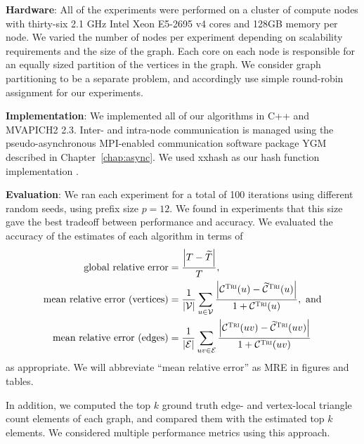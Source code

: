 \documentclass[10]{report}
\newcommand{\algoname}[1]{\textnormal{\textsc{#1}}}
\begin{document}
\noindent
\textbf{Hardware}: 
All of the experiments were performed on a cluster of compute nodes with thirty-six 2.1 GHz Intel Xeon E5-2695 v4 cores and 128GB memory per node. 
We varied the number of nodes per experiment depending on scalability requirements and the size of the graph.
Each core on each node is responsible for an equally sized partition of the vertices in the graph.
We consider graph partitioning to be a separate problem, and accordingly use simple round-robin assignment for our experiments.

\noindent
\textbf{Implementation}:
We implemented all of our algorithms in C++ and MVAPICH2 2.3. 
Inter- and intra-node communication is managed using the pseudo-asynchronous MPI-enabled communication software package YGM described in Chapter~\ref{chap:async}.
We used xxhash as our hash function implementation \cite{xxhash}. 

\noindent
\textbf{Evaluation}:
We ran each experiment for a total of 100 iterations using different random seeds, using prefix size $p = 12$. 
We found in experiments that this size gave the best tradeoff between performance and accuracy.
We evaluated the accuracy of the estimates of each algorithm in terms of 
%
\begin{align}
\label{eq:global_error}
\text{global relative error} &= \frac{ \left | T - \widetilde{T} \right |}{T}, \\
\label{eq:vertex_mre}
\text{mean relative error (vertices)} &= \frac{1}{|\mathcal{V}|} \sum_{u \in \mathcal{V}} \frac{\left | \mathcal{C}^{\algoname{Tri}}(u) - \widetilde{\mathcal{C}}^{\algoname{Tri}}(u) \right |}{1 + \mathcal{C}^{\algoname{Tri}}(u)}, \text{ and} \\
\label{eq:edge_mre}
\text{mean relative error (edges)} &= \frac{1}{|\mathcal{E}|} \sum_{uv \in \mathcal{E}} \frac{\left | \mathcal{C}^{\algoname{Tri}}(uv) - \widetilde{\mathcal{C}}^{\algoname{Tri}}(uv) \right |}{1 + \mathcal{C}^{\algoname{Tri}}(uv)}
\end{align}
%
as appropriate.
We will abbreviate ``mean relative error'' as MRE in figures and tables.

In addition, we computed the top $k$ ground truth edge- and vertex-local triangle count elements of each graph, and compared them with the estimated top $k$ elements. 
We considered multiple performance metrics using this approach.
\end{document}
